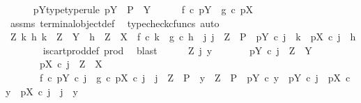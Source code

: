 \begin{isabellebody}
\ \ \ \ \isamarkupfalse%
\ pY{\isacharunderscore}{\kern0pt}type{\isacharbrackleft}{\kern0pt}type{\isacharunderscore}{\kern0pt}rule{\isacharbrackright}{\kern0pt}{\isacharcolon}{\kern0pt}\ {\isachardoublequoteopen}pY\ {\isacharcolon}{\kern0pt}\ P\ {\isasymrightarrow}\ Y{\isachardoublequoteclose}\isanewline
\ \ \ \ \isamarkupfalse%
\ {\isachardoublequoteopen}f\ {\isasymcirc}\isactrlsub c\ pY\ {\isacharequal}{\kern0pt}\ g\ {\isasymcirc}\isactrlsub c\ pX{\isachardoublequoteclose}\isanewline
\ \ \ \ \ \ \isamarkupfalse%
\ assms{\isacharparenleft}{\kern0pt}{}{\isacharparenright}{\kern0pt}\ terminal{\isacharunderscore}{\kern0pt}object{\isacharunderscore}{\kern0pt}def\ \isamarkupfalse%
\ {\isacharparenleft}{\kern0pt}typecheck{\isacharunderscore}{\kern0pt}cfuncs{\isacharcomma}{\kern0pt}\ auto{\isacharparenright}{\kern0pt}\ \ \isanewline
\ \ \ \ \isamarkupfalse%
\ {\isachardoublequoteopen}{\isasymAnd}Z\ k\ h{\isachardot}{\kern0pt}\ k\ {\isacharcolon}{\kern0pt}\ Z\ {\isasymrightarrow}\ Y\ {\isasymLongrightarrow}\ h\ {\isacharcolon}{\kern0pt}\ Z\ {\isasymrightarrow}\ X\ {\isasymLongrightarrow}\ f\ {\isasymcirc}\isactrlsub c\ k\ {\isacharequal}{\kern0pt}\ g\ {\isasymcirc}\isactrlsub c\ h\ {\isasymLongrightarrow}\ {\isasymexists}j{\isachardot}{\kern0pt}\ j\ {\isacharcolon}{\kern0pt}\ Z\ {\isasymrightarrow}\ P\ {\isasymand}\ pY\ {\isasymcirc}\isactrlsub c\ j\ {\isacharequal}{\kern0pt}\ k\ {\isasymand}\ pX\ {\isasymcirc}\isactrlsub c\ j\ {\isacharequal}{\kern0pt}\ h{\isachardoublequoteclose}\isanewline
\ \ \ \ \ \ \isamarkupfalse%
\ is{\isacharunderscore}{\kern0pt}cart{\isacharunderscore}{\kern0pt}prod{\isacharunderscore}{\kern0pt}def\ prod\ \isamarkupfalse%
\ blast\isanewline
\ \ \ \ \isamarkupfalse%
\ {\isachardoublequoteopen}{\isasymAnd}Z\ j\ y{\isachardot}{\kern0pt}\isanewline
\ \ \ \ \ \ \ pY\ {\isasymcirc}\isactrlsub c\ j\ {\isacharcolon}{\kern0pt}\ Z\ {\isasymrightarrow}\ Y\ {\isasymLongrightarrow}\isanewline
\ \ \ \ \ \ \ pX\ {\isasymcirc}\isactrlsub c\ j\ {\isacharcolon}{\kern0pt}\ Z\ {\isasymrightarrow}\ X\ {\isasymLongrightarrow}\isanewline
\ \ \ \ \ \ \ f\ {\isasymcirc}\isactrlsub c\ pY\ {\isasymcirc}\isactrlsub c\ j\ {\isacharequal}{\kern0pt}\ g\ {\isasymcirc}\isactrlsub c\ pX\ {\isasymcirc}\isactrlsub c\ j\ {\isasymLongrightarrow}\ j\ {\isacharcolon}{\kern0pt}\ Z\ {\isasymrightarrow}\ P\ {\isasymLongrightarrow}\ y\ {\isacharcolon}{\kern0pt}\ Z\ {\isasymrightarrow}\ P\ {\isasymLongrightarrow}\ pY\ {\isasymcirc}\isactrlsub c\ y\ {\isacharequal}{\kern0pt}\ pY\ {\isasymcirc}\isactrlsub c\ j\ {\isasymLongrightarrow}\ pX\ {\isasymcirc}\isactrlsub c\ y\ {\isacharequal}{\kern0pt}\ pX\ {\isasymcirc}\isactrlsub c\ j\ {\isasymLongrightarrow}\ j\ {\isacharequal}{\kern0pt}\ y{\isachardoublequoteclose}\isanewline

\end{isabellebody}
